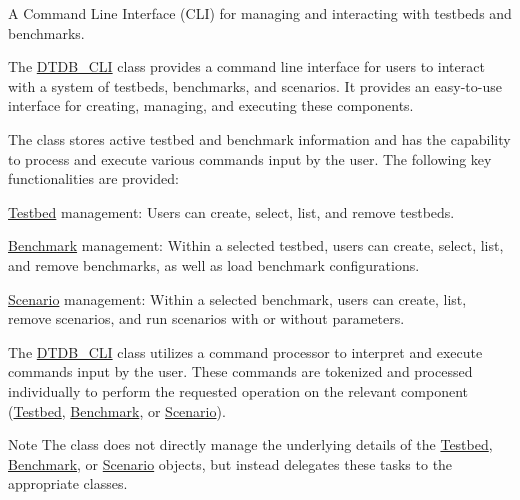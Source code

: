A Command Line Interface (CLI) for managing and interacting with testbeds and benchmarks.

The \mbox{\hyperlink{classDTDB__CLI}{DTDB\+\_\+\+CLI}} class provides a command line interface for users to interact with a system of testbeds, benchmarks, and scenarios. It provides an easy-\/to-\/use interface for creating, managing, and executing these components.

The class stores active testbed and benchmark information and has the capability to process and execute various commands input by the user. The following key functionalities are provided\+:


\begin{DoxyItemize}
\item \mbox{\hyperlink{classTestbed}{Testbed}} management\+: Users can create, select, list, and remove testbeds.
\item \mbox{\hyperlink{classBenchmark}{Benchmark}} management\+: Within a selected testbed, users can create, select, list, and remove benchmarks, as well as load benchmark configurations.
\item \mbox{\hyperlink{classScenario}{Scenario}} management\+: Within a selected benchmark, users can create, list, remove scenarios, and run scenarios with or without parameters.
\end{DoxyItemize}

The \mbox{\hyperlink{classDTDB__CLI}{DTDB\+\_\+\+CLI}} class utilizes a command processor to interpret and execute commands input by the user. These commands are tokenized and processed individually to perform the requested operation on the relevant component (\mbox{\hyperlink{classTestbed}{Testbed}}, \mbox{\hyperlink{classBenchmark}{Benchmark}}, or \mbox{\hyperlink{classScenario}{Scenario}}).

\begin{DoxyNote}{Note}
The class does not directly manage the underlying details of the \mbox{\hyperlink{classTestbed}{Testbed}}, \mbox{\hyperlink{classBenchmark}{Benchmark}}, or \mbox{\hyperlink{classScenario}{Scenario}} objects, but instead delegates these tasks to the appropriate classes. 
\end{DoxyNote}

